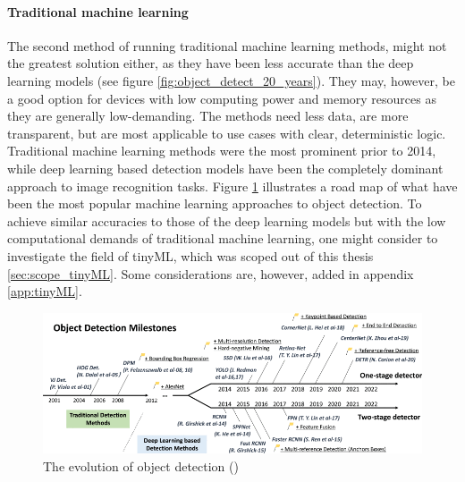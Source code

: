 \paragraph{Traditional machine learning}
The second method of running traditional machine learning methods, might not the greatest solution either, as they have been less accurate than the deep learning models (see figure \ref{fig:object_detect_20_years}). They may, however, be a good option for devices with low computing power and memory resources as they are generally low-demanding. The methods need less data, are more transparent, but are most applicable to use cases with clear, deterministic logic. Traditional machine learning methods were the most prominent prior to 2014, while deep learning based detection models have been the completely dominant approach to image recognition tasks. Figure \ref{fig:road_map} illustrates a road map of what have been the most popular machine learning approaches to object detection. To achieve similar accuracies to those of the deep learning models but with the low computational demands of traditional machine learning, one might consider to investigate the field of tinyML, which was scoped out of this thesis \ref{sec:scope_tinyML}. Some considerations are, however, added in appendix \ref{app:tinyML}.

\begin{figure}[H]
    \centering
    \includegraphics[width=1\linewidth]{Images/Diagrams/object_detection_directions.png}
    \caption{The evolution of object detection (\cite{zou2023object_detection_in_20_years})}
    \label{fig:road_map}
\end{figure}

